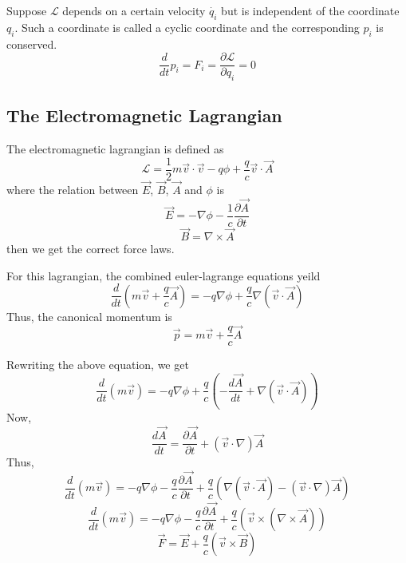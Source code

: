 \documentclass[12pt,a4paper]{report}
\newcommand{\der}[2]{\frac{d#1}{d#2}}
\newcommand{\parder}[2]{\frac{\partial#1}{\partial#2}}
\newcommand{\lagrangian}{\mathcal{L}}
\begin{document}
Suppose $\lagrangian$ depends on a certain velocity $\dot{q_i}$ but is independent of the coordinate $q_i$. Such a coordinate is called a cyclic coordinate and the corresponding $p_i$ is conserved.
\begin{equation*}
    \der{}{t}p_i = F_i = \parder{\lagrangian}{q_i} = 0
\end{equation*}

\subsection{The Electromagnetic Lagrangian}

The electromagnetic lagrangian is defined as
\begin{equation*}
    \lagrangian = \frac{1}{2} m \vec{v}\cdot\vec{v} - q\phi + \frac{q}{c}\vec{v}\cdot\vec{A}
\end{equation*}
where the relation between $\vec{E}$, $\vec{B}$, $\vec{A}$ and $\phi$ is
\begin{equation*}
    \vec{E} = -\nabla \phi - \frac{1}{c} \parder{\vec{A}}{t}
\end{equation*}
\begin{equation*}
    \vec{B} = \nabla \times \vec{A}
\end{equation*}
then we get the correct force laws.

For this lagrangian, the combined euler-lagrange equations yeild
\begin{equation*}
    \der{}{t} \left( m\vec{v} + \frac{q}{c} \vec{A} \right) = -q\nabla \phi + \frac{q}{c} \nabla (\vec{v} \cdot \vec{A})
\end{equation*}
Thus, the canonical momentum is
\begin{equation*}
    \vec{p} = m\vec{v} + \frac{q}{c} \vec{A}
\end{equation*}

Rewriting the above equation, we get
\begin{equation*}
    \der{}{t} ( m\vec{v} ) = -q\nabla \phi + \frac{q}{c} \left( -\der{\vec{A}}{t} + \nabla (\vec{v} \cdot \vec{A})\right)
\end{equation*}
Now,
\begin{equation*}
    \der{\vec{A}}{t} = \parder{\vec{A}}{t} + (\vec{v}\cdot\nabla)\vec{A}
\end{equation*}
Thus,
\begin{equation*}
    \der{}{t} ( m\vec{v} ) = -q\nabla \phi - \frac{q}{c} \parder{\vec{A}}{t} + \frac{q}{c} \left(\nabla (\vec{v} \cdot \vec{A}) - (\vec{v}\cdot\nabla)\vec{A}\right)
\end{equation*}
\begin{equation*}
    \der{}{t} ( m\vec{v} ) = -q\nabla \phi - \frac{q}{c} \parder{\vec{A}}{t} + \frac{q}{c} \left(\vec{v} \times (\nabla \times \vec{A})\right)
\end{equation*}
\begin{equation*}
    \vec{F} = \vec{E} + \frac{q}{c} \left(\vec{v} \times \vec{B}\right)
\end{equation*}
\end{document}
